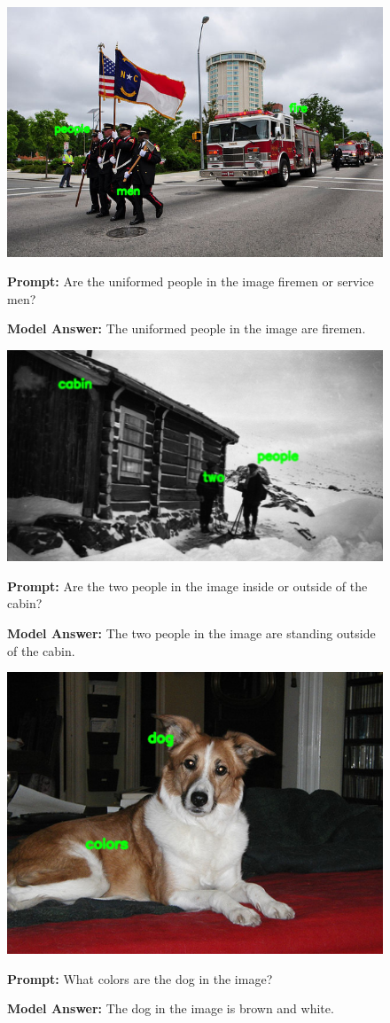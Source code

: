 \documentclass[11pt]{article}
\begin{document}
\begin{figure}[H]
    \centering
    \includegraphics[width=0.6\linewidth]{reordering_383.png}\par
    \vspace{1em}
    \raggedright
    \textbf{Prompt:} Are the uniformed people in the image firemen or service men?
    
    \textbf{Model Answer:} The uniformed people in the image are firemen.
\end{figure}



\begin{figure}[H]
    \centering
    \includegraphics[width=0.6\linewidth]{reordering_15.png}\par
    \vspace{1em}
    \raggedright
    \textbf{Prompt:} Are the two people in the image inside or outside of the cabin?
    
    \textbf{Model Answer:} The two people in the image are standing outside of the cabin.
    \label{fig:qwen_loss_plot}
\end{figure}

\begin{figure}[H]
    \centering
    \includegraphics[width=0.6\linewidth]{reordering_230.png}\par
    \vspace{1em}
    \raggedright
    \textbf{Prompt:} What colors are the dog in the image?
    
    \textbf{Model Answer:} The dog in the image is brown and white.
\end{figure}
\end{document}
